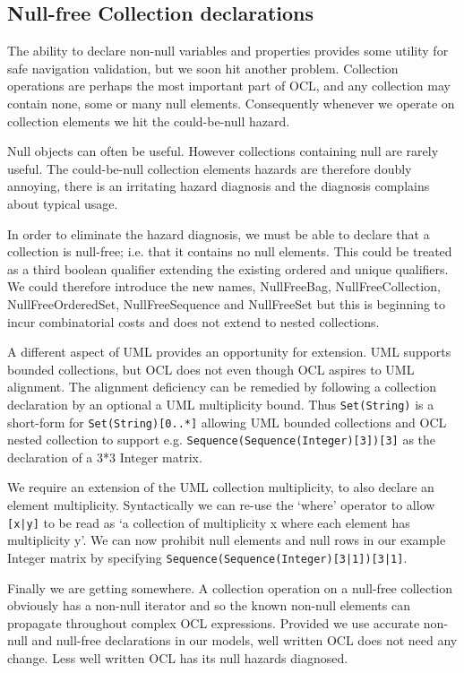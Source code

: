 \documentclass{llncs}
\begin{document}
\subsection{Null-free Collection declarations}

The ability to declare non-null variables and properties provides some utility for safe navigation validation, but we soon hit another problem. Collection operations are perhaps the most important part of OCL, and any collection may contain none, some or many null elements. Consequently whenever we operate on collection elements we hit the could-be-null hazard.

Null objects can often be useful. However collections containing null are rarely useful. The could-be-null collection elements hazards are therefore doubly annoying, there is an irritating hazard diagnosis and the diagnosis complains about typical usage.

In order to eliminate the hazard diagnosis, we must be able to declare that a collection is null-free; i.e. that it contains no null elements. This could be treated as a third boolean qualifier extending the existing ordered and unique qualifiers. We could therefore introduce the new names, NullFreeBag, NullFreeCollection, NullFreeOrderedSet, NullFreeSequence and NullFreeSet but this is beginning to incur combinatorial costs and does not extend to nested collections.

A different aspect of UML provides an opportunity for extension. UML supports bounded collections, but OCL does not even though OCL aspires to UML alignment. The alignment deficiency can be remedied by following a collection declaration by an optional a UML multiplicity bound. Thus \verb|Set(String)| is a short-form for \verb|Set(String)[0..*]| allowing UML bounded collections and OCL nested collection to support e.g. \verb|Sequence(Sequence(Integer)[3])[3]| as the declaration of a 3*3 Integer matrix.

We require an extension of the UML collection multiplicity, to also declare an element multiplicity. Syntactically we can re-use the `where' operator to allow \verb$[x|y]$ to be read as `a collection of multiplicity x where each element has multiplicity y'. We can now prohibit null elements and null rows in our example Integer matrix by specifying \verb$Sequence(Sequence(Integer)[3|1])[3|1]$.

Finally we are getting somewhere. A collection operation on a null-free collection obviously has a non-null iterator and so the known non-null elements can propagate throughout complex OCL expressions. Provided we use accurate non-null and null-free declarations in our models, well written OCL does not need any change. Less well written OCL has its null hazards diagnosed. 
\end{document}

